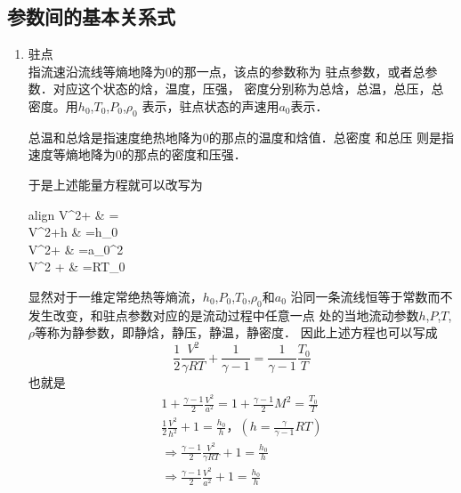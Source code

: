 \subsection{参数间的基本关系式}
\begin{enumerate}
	\item 驻点 \\
	      指流速沿流线等熵地降为0的那一点，该点的参数称为
	      驻点参数，或者总参数．对应这个状态的焓，温度，压强，
	      密度分别称为总焓，总温，总压，总密度。用$h_0$,$T_0$,$P_0$,$\rho_0$
        表示，驻点状态的声速用$a_0$表示．
	      \begin{notice}
		      总温和总焓是指速度绝热地降为0的那点的温度和焓值．总密度
		      和总压
		      则是指速度等熵地降为0的那点的密度和压强．
	      \end{notice}
	      于是上述能量方程就可以改写为
	      \begin{empheq}[box=\widefbox]{align}
		      V^2+ & = \\
		      V^2+h                                     & =h_0                                       \\
		      V^2+                  & =a_0^2                                     \\
		      V^2 +         & =RT_0
	      \end{empheq}
	      显然对于一维定常绝热等熵流，$h_0$,$P_0$,$T_0$,$\rho_0$和$a_0$
	      沿同一条流线恒等于常数而不发生改变，和驻点参数对应的是流动过程中任意一点
	      处的当地流动参数$h$,$P$,$T$,$\rho$等称为静参数，即静焓，静压，静温，静密度．
	      因此上述方程也可以写成
	      \[
		      \frac{1}{2 }\frac{V^2}{\gamma RT}+\frac{1}{\gamma-1 }=\frac{1}{\gamma-1 }\frac{T_0}{T }
	      \]
	      也就是
	      \begin{gather*}
		      1+\frac{\gamma-1 }{2 }\frac{V^2}{a^2}=1+\frac{\gamma-1 }{2 }M^2=\frac{T_0}{T }  \\
		      \frac{1}{2 }\frac{V^2}{h^2}+1 =\frac{h_0}{h }，(h=\frac{\gamma}{\gamma-1 }RT)                   \\
		      \Rightarrow \frac{\gamma-1 }{2 }\frac{V^2}{\gamma RT }+1
		      =\frac{h_0}{h }                                                  \\
		      \Rightarrow \frac{\gamma-1 }{2 }\frac{V^2}{a^2}+1
		      =\frac{h_0}{h }
	      \end{gather*}

\end{enumerate}
